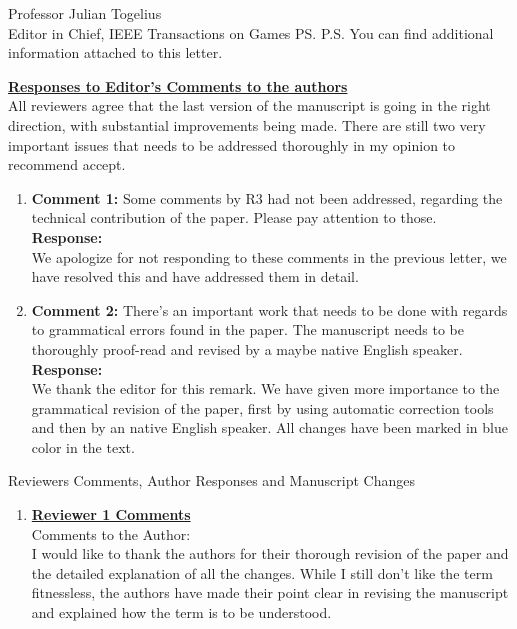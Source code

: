 \documentclass[10pt]{letter} %
\begin{document}
\begin{letter}{Professor Julian Togelius \\ Editor in Chief, IEEE Transactions on Games}
\ps{P.S. You can find additional information attached to this letter.} %







\newpage


{\bf \underline{ Responses to Editor's  Comments to the authors}}\\
All reviewers agree that the last version of the manuscript is going in the right direction, with substantial improvements being made. There are still two very important issues that needs to be addressed thoroughly in my opinion to recommend accept.
			\begin{enumerate}
					\item {\bf Comment 1:} 
Some comments by R3 had not been addressed, regarding the technical contribution of the paper. Please pay attention to those.\\
	 {\bf Response:} \\
We apologize for not responding to these comments in the previous letter, we have resolved this and have addressed them in detail.
		\item {\bf Comment 2:} 
There's an important work that needs to be done with regards to grammatical errors found in the paper. The manuscript needs to be thoroughly proof-read and revised by a maybe native English speaker.\\
	 {\bf Response:} \\
	We thank the editor for this remark. We have given more importance to the grammatical revision of the paper, first by using automatic correction tools and then by an native English speaker. All changes have been marked in blue color in the text.
			\end{enumerate}


\newpage
 Reviewers Comments, Author Responses and Manuscript Changes
\begin{enumerate}

\item {\bf \underline{ Reviewer 1 Comments}}\\
		Comments to the Author:\\
		I would like to thank the authors for their thorough revision of the paper and the detailed explanation of all the changes. While I still don't like the term fitnessless, the authors have made their point clear in revising the manuscript and explained how the term is to be understood.


\end{enumerate}
\end{letter}
\end{document}
